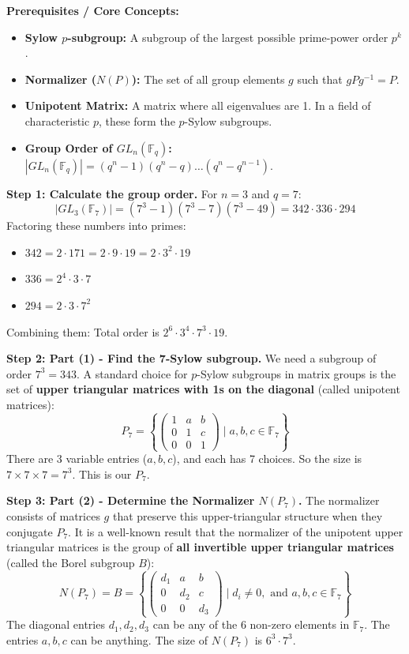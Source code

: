\begin{solution}
\textbf{Prerequisites / Core Concepts:}
\begin{itemize}
    \item \textbf{Sylow $p$-subgroup:} A subgroup of the largest possible prime-power order $p^k$.
    \item \textbf{Normalizer ($N(P)$):} The set of all group elements $g$ such that $gPg^{-1} = P$.
    \item \textbf{Unipotent Matrix:} A matrix where all eigenvalues are 1. In a field of characteristic $p$, these form the $p$-Sylow subgroups.
    \item \textbf{Group Order of $GL_n(\mathbb{F}_q)$:} $|GL_n(\mathbb{F}_q)| = (q^n - 1)(q^n - q) \dots (q^n - q^{n-1})$.
\end{itemize}

\textbf{Step 1: Calculate the group order.}
For $n=3$ and $q=7$:
\[ |GL_3(\mathbb{F}_7)| = (7^3 - 1)(7^3 - 7)(7^3 - 49) = 342 \cdot 336 \cdot 294 \]
Factoring these numbers into primes:
\begin{itemize}
    \item $342 = 2 \cdot 171 = 2 \cdot 9 \cdot 19 = 2 \cdot 3^2 \cdot 19$
    \item $336 = 2^4 \cdot 3 \cdot 7$
    \item $294 = 2 \cdot 3 \cdot 7^2$
\end{itemize}
Combining them: Total order is $2^6 \cdot 3^4 \cdot 7^3 \cdot 19$.

\textbf{Step 2: Part (1) - Find the 7-Sylow subgroup.}
We need a subgroup of order $7^3 = 343$.
A standard choice for $p$-Sylow subgroups in matrix groups is the set of \textbf{upper triangular matrices with 1s on the diagonal} (called unipotent matrices):
\[ P_7 = \left\{ \begin{pmatrix} 1 & a & b \\ 0 & 1 & c \\ 0 & 0 & 1 \end{pmatrix} \mid a, b, c \in \mathbb{F}_7 \right\} \]
There are 3 variable entries ($a, b, c$), and each has 7 choices. So the size is $7 \times 7 \times 7 = 7^3$. This is our $P_7$.

\textbf{Step 3: Part (2) - Determine the Normalizer $N(P_7)$.}
The normalizer consists of matrices $g$ that preserve this upper-triangular structure when they conjugate $P_7$.
It is a well-known result that the normalizer of the unipotent upper triangular matrices is the group of \textbf{all invertible upper triangular matrices} (called the Borel subgroup $B$):
\[ N(P_7) = B = \left\{ \begin{pmatrix} d_1 & a & b \\ 0 & d_2 & c \\ 0 & 0 & d_3 \end{pmatrix} \mid d_i \neq 0, \text{ and } a, b, c \in \mathbb{F}_7 \right\} \]
The diagonal entries $d_1, d_2, d_3$ can be any of the 6 non-zero elements in $\mathbb{F}_7$. The entries $a, b, c$ can be anything.
The size of $N(P_7)$ is $6^3 \cdot 7^3$.


\end{solution}

